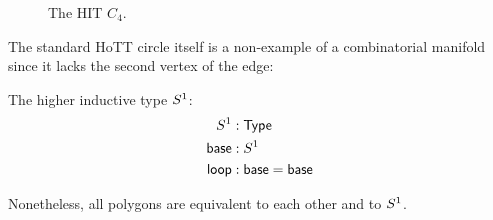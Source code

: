 \begin{figure}[htbp]
\centering

\caption{The HIT \( C_4 \).}
\end{figure}

The standard HoTT circle itself is a non-example of a combinatorial manifold since it lacks the second vertex of the edge:

\begin{mydef}
The higher inductive type \( S^1 \):
\begin{align*}
S^1 &:\mathsf{Type} \\
\mathsf{base}&:S^1 \\
\mathsf{loop}&:\mathsf{base}=\mathsf{base}
\end{align*}
\end{mydef}

Nonetheless, all polygons are equivalent to each other and to \( S^1 \).

